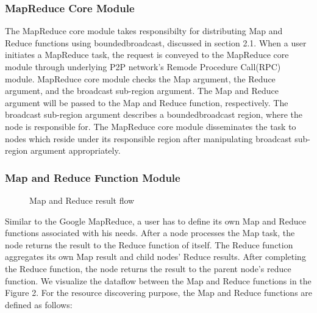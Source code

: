 \documentclass{acm_proc_article-sp}
\begin{document}
\subsubsection{MapReduce Core Module}
The MapReduce core module takes responsibilty for distributing Map and Reduce functions using boundedbroadcast, discussed in section 2.1. 
When a user initiates a MapReduce task, the request is conveyed to the MapReduce core module through underlying P2P network's Remode Procedure Call(RPC) module. 
MapReduce core module checks the Map argument, the Reduce argument, and the broadcast sub-region argument. 
The Map and Reduce argument will be passed to the Map and Reduce function, respectively. 
The broadcast sub-region argument describes a boundedbroadcast region, where the node is responsible for. 
The MapReduce core module disseminates the task to nodes which reside under its responsible region after manipulating broadcast sub-region argument appropriately.
\subsubsection{Map and Reduce Function Module}
\begin{figure}
\centering
{}
\caption{Map and Reduce result flow}
\end{figure}
Similar to the Google MapReduce, a user has to define its own Map and Reduce functions associated with his needs. 
After a node processes the Map task, the node returns the result to the Reduce function of itself.
The Reduce function aggregates its own Map result and child nodes' Reduce results. 
After completing the Reduce function, the node returns the result to the parent node's reduce function.
We visualize the dataflow between the Map and Reduce functions in the Figure 2.
For the resource discovering purpose, the Map and Reduce functions are defined as follows:
\end{document}
